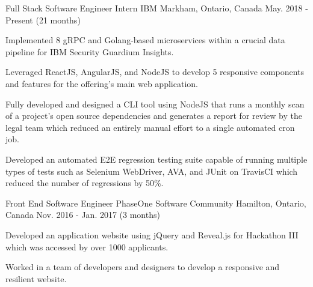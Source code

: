 


\begin{cventries}


\cventry
{Full Stack Software Engineer Intern} %
{IBM} %
{Markham, Ontario, Canada} %
{May. 2018 - Present (21 months)} %
{ %
\begin{cvitems}
\item {Implemented 8 gRPC and Golang-based microservices within a crucial data pipeline for IBM Security Guardium Insights.}
\item {Leveraged ReactJS, AngularJS, and NodeJS to develop 5 responsive components and features for the offering's main web application.}
\item {Fully developed and designed a CLI tool using NodeJS that runs a monthly scan of a project's open source dependencies and generates a report for review by the legal team which reduced an entirely manual effort to a single automated cron job.}
\item {Developed an automated E2E regression testing suite capable of running multiple types of tests such as Selenium WebDriver, AVA, and JUnit on TravisCI which reduced the number of regressions by 50\%.}
\end{cvitems}
}


\cventry
{Front End Software Engineer} %
{PhaseOne Software Community} %
{Hamilton, Ontario, Canada} %
{Nov. 2016 - Jan. 2017 (3 months)} %
{ %
\begin{cvitems}
\item {Developed an application website using jQuery and Reveal.js for Hackathon III which was accessed by over 1000 applicants.}
\item {Worked in a team of developers and designers to develop a responsive and resilient website.}
\end{cvitems}
}


\end{cventries}